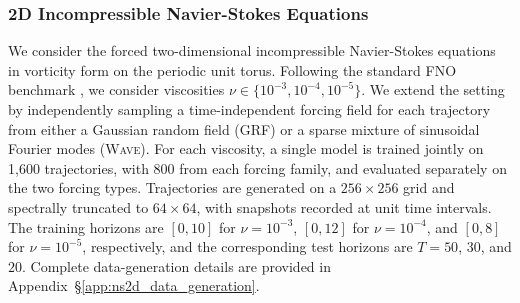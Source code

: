 \documentclass[11pt]{article}
\begin{document}
\subsubsection{2D Incompressible Navier-Stokes Equations}
\label{sec:ns2d_results}
We consider the forced two-dimensional incompressible Navier-Stokes equations in vorticity form on the periodic unit torus. Following the standard FNO benchmark \citep{li2020fourier}, we consider viscosities $\nu\in\{10^{-3},10^{-4},10^{-5}\}$. We extend the setting by independently sampling a time-independent forcing field for each trajectory from either a Gaussian random field (\textsc{GRF}) or a sparse mixture of sinusoidal Fourier modes (\textsc{Wave}). For each viscosity, a single model is trained jointly on 1,600 trajectories, with 800 from each forcing family, and evaluated separately on the two forcing types. Trajectories are generated on a $256\times256$ grid and spectrally truncated to $64\times64$, with snapshots recorded at unit time intervals. The training horizons are $[0,10]$ for $\nu=10^{-3}$, $[0,12]$ for $\nu=10^{-4}$, and $[0,8]$ for $\nu=10^{-5}$, respectively, and the corresponding test horizons are $T=50$, $30$, and $20$. Complete data-generation details are provided in Appendix~\S\ref{app:ns2d_data_generation}.
\end{document}
